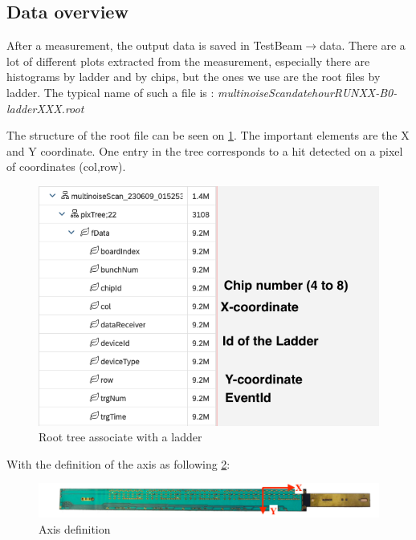 \documentclass[12pt,oneside,a4]{article}
\begin{document}
    \subsection{Data overview}\label{Data overview}
    After a measurement, the output data is saved in Test\textunderscore Beam$\rightarrow$data. 
    There are a lot of different plots extracted from the measurement, especially there are histograms by ladder and by chips, but the ones we use are the root files by ladder. The typical name of such a file is : \textit{multinoiseScan\textunderscore date\textunderscore hour\textunderscore RUNXX-B0-ladderXXX.root}
    
    The structure of the root file can be seen on \ref{fig:10}. The important elements are the X and Y coordinate. One entry in the tree corresponds to a hit detected on a pixel of coordinates (col,row).
    
\begin{figure}[h]
        \centering
        \includegraphics[scale =0.7]{figures/ROOT_file.png}
        \caption{Root tree associate with a ladder}
        \label{fig:10}
\end{figure}

With the definition of the axis as following \ref{fig:11}:

\begin{figure}[h]
        \centering
        \includegraphics[scale =0.7]{figures/Axis.png}
        \caption{Axis definition}
        \label{fig:11}
\end{figure}
\end{document}
